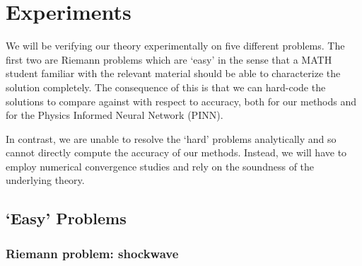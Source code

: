 \documentclass{myproject}
\begin{document}

\section{Experiments}

We will be verifying our theory experimentally on five different problems. The first two are Riemann problems which are `easy' in the sense that a MATH student familiar with the relevant material should be able to characterize the solution completely. The consequence of this is that we can hard-code the solutions to compare against with respect to accuracy, both for our methods and for the Physics Informed Neural Network (PINN).

In contrast, we are unable to resolve the `hard' problems analytically and so cannot directly compute the accuracy of our methods. Instead, we will have to employ numerical convergence studies and rely on the soundness of the underlying theory.

\subsection{`Easy' Problems}

\subsubsection{Riemann problem: shockwave}
\end{document}

